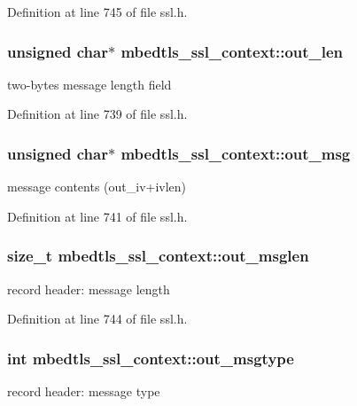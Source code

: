 Definition at line 745 of file ssl.\-h.

\hypertarget{structmbedtls__ssl__context_a492e5b5ecc58e0f68c7498eaa07fc273}{
\subsubsection[{out\-\_\-len}]{\setlength{\rightskip}{0pt plus 5cm}unsigned char$\ast$ mbedtls\-\_\-ssl\-\_\-context\-::out\-\_\-len}}\label{structmbedtls__ssl__context_a492e5b5ecc58e0f68c7498eaa07fc273}
two-\/bytes message length field 

Definition at line 739 of file ssl.\-h.

\hypertarget{structmbedtls__ssl__context_a6398baeb1222e1b166531b8528800a20}{
\subsubsection[{out\-\_\-msg}]{\setlength{\rightskip}{0pt plus 5cm}unsigned char$\ast$ mbedtls\-\_\-ssl\-\_\-context\-::out\-\_\-msg}}\label{structmbedtls__ssl__context_a6398baeb1222e1b166531b8528800a20}
message contents (out\-\_\-iv+ivlen) 

Definition at line 741 of file ssl.\-h.

\hypertarget{structmbedtls__ssl__context_aa004c925da73e2536e74ce8d36aefcb0}{
\subsubsection[{out\-\_\-msglen}]{\setlength{\rightskip}{0pt plus 5cm}size\-\_\-t mbedtls\-\_\-ssl\-\_\-context\-::out\-\_\-msglen}}\label{structmbedtls__ssl__context_aa004c925da73e2536e74ce8d36aefcb0}
record header\-: message length 

Definition at line 744 of file ssl.\-h.

\hypertarget{structmbedtls__ssl__context_a847547cec75d00533c8c0373f6eaa759}{
\subsubsection[{out\-\_\-msgtype}]{\setlength{\rightskip}{0pt plus 5cm}int mbedtls\-\_\-ssl\-\_\-context\-::out\-\_\-msgtype}}\label{structmbedtls__ssl__context_a847547cec75d00533c8c0373f6eaa759}
record header\-: message type 

